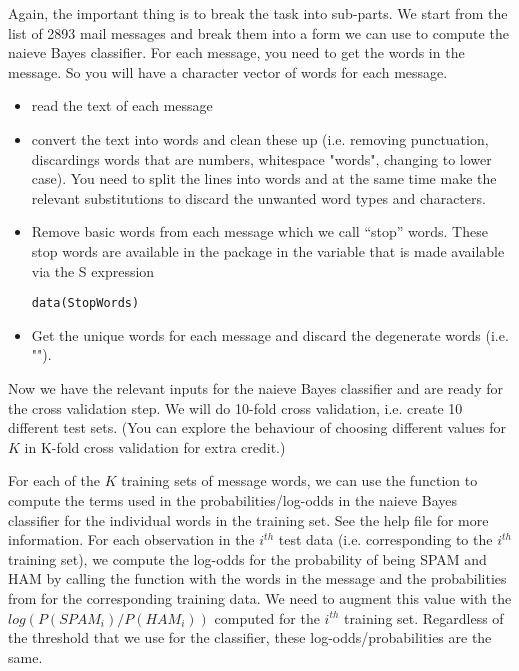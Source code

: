 \documentclass{article}
\begin{document}
Again, the important thing is to break the task into sub-parts.  We
start from the list of 2893 mail messages and break them into a form
we can use to compute the naieve Bayes classifier.
For each message, you need to get the words
in the message.  So you will have a
character vector of words for each 
message.

\begin{itemize}
\item read the text of each message
\item convert the text into words and clean these up (i.e. removing
  punctuation, discardings words that are numbers, whitespace "words",
  changing to lower case).
  You need to split the lines into words and at the same
  time make the relevant substitutions to discard the unwanted
  word types and characters.

\item  Remove basic words from each message which we call ``stop'' words.
These stop words are available in the
 package in the variable
 that is made available
via the S expression
\begin{verbatim}
data(StopWords)
\end{verbatim}

\item Get the unique words for each message and discard the degenerate
  words (i.e. "").

\end{itemize}
Now we have the relevant inputs for the naieve Bayes classifier and
are ready for the cross validation step.  We will do 10-fold cross
validation, i.e. create 10 different test sets.  (You can explore the
behaviour of choosing different values for $K$ in K-fold cross
validation for extra credit.)

For each of the $K$ training sets of message words, we can use the
function  to compute the terms used in
the probabilities/log-odds in the naieve Bayes classifier for the
individual words in the training set.  See the help file for more
information.  For each observation in the $i^{th}$ test data (i.e.
corresponding to the $i^{th}$ training set), we compute the log-odds
for the probability of being SPAM and HAM by calling the function
 with the words in the message
and the probabilities from  for the
corresponding training data.  We need to augment this value with the
$log(P(SPAM_{i})/P(HAM_{i}))$ computed for the $i^{th}$ training
set.  Regardless of the threshold that we use for the classifier,
these log-odds/probabilities are the same. 
\end{document}
